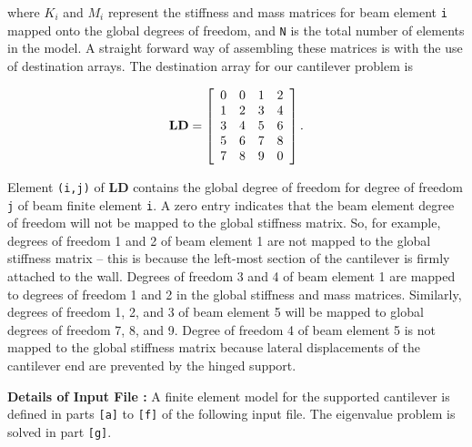 \vspace{0.15 in}\noindent
where ${K_i}$ and ${M_i}$ represent the stiffness and mass matrices for beam
element {\tt i} mapped onto the global degrees of freedom,
and {\tt N} is the total number of elements in the model.
A straight forward way of assembling these matrices is
with the use of destination arrays. The destination array
for our cantilever problem is

\begin{equation}
{\bf LD} = \left[
\begin{array}{cccc}
         0 & 0 & 1 & 2 \\
         1 & 2 & 3 & 4 \\
         3 & 4 & 5 & 6 \\
         5 & 6 & 7 & 8 \\
         7 & 8 & 9 & 0 
\end{array} \right].
\end{equation}

\vspace{0.15 in}\noindent
Element {\tt (i,j)} of {\bf LD} contains the global degree of
freedom for degree of freedom {\tt j} of beam finite element {\tt i}.
A zero entry indicates that the beam element degree of freedom
will not be mapped to the global stiffness matrix.
So, for example, degrees of freedom 1 and 2 of beam element 1 are
not mapped to the global stiffness matrix -- this is because the left-most
section of the cantilever is firmly attached to the wall.
Degrees of freedom 3 and 4 of beam element 1 are mapped
to degrees of freedom 1 and 2 in the global stiffness and mass matrices.
Similarly, degrees of freedom 1, 2, and 3 of beam element 5 will be
mapped to global degrees of freedom 7, 8, and 9.
Degree of freedom 4 of beam element 5 is not mapped to the global stiffness
matrix because lateral displacements of the cantilever end are prevented
by the hinged support.

\vspace{0.20 in}\noindent
{\bf Details of Input File :} A finite element model for the supported cantilever
is defined in parts {\tt [a]} to {\tt [f]} of the following input file.
The eigenvalue problem is solved in part {\tt [g]}.

